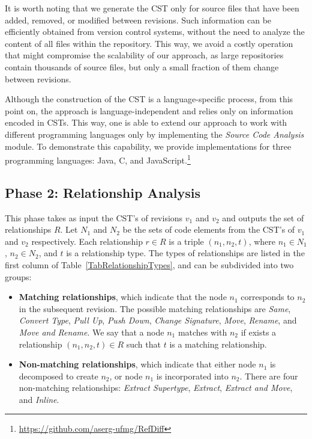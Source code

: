 It is worth noting that we generate the CST only for source files that have been added, removed, or modified between revisions. 
Such information can be efficiently obtained from version control systems, without the need to analyze the content of all files within the repository.
This way, we avoid a costly operation that might compromise the scalability of our approach, as large repositories contain thousands of source files, but only a small fraction of them change between revisions.

Although the construction of the CST is a language-specific process, from this point on, the approach is language-independent and relies only on information encoded in CSTs.
This way, one is able to extend our approach to work with different programming languages only by implementing the \emph{Source Code Analysis} module.
To demonstrate this capability, we provide implementations for three programming languages: Java, C, and JavaScript.\footnote{\url{https://github.com/aserg-ufmg/RefDiff}}


\subsection{Phase 2: Relationship Analysis}

This phase takes as input the CST's of revisions $v_1$ and $v_2$ and outputs the set of relationships $R$. Let $N_1$ and $N_2$ be the sets of code elements from the CST's of $v_1$ and $v_2$ respectively. Each relationship $r \in R$ is a triple $(n_1, n_2, t)$, where $n_1 \in N_1$, $n_2 \in N_2$, and $t$ is a relationship type. The types of relationships are listed in the first column of Table~\ref{TabRelationshipTypes}, and can be subdivided into two groups:
\begin{itemize}
\item \textbf{Matching relationships}, which indicate that the node $n_1$ corresponds to $n_2$ in the subsequent revision.
The possible matching relationships are \textit{Same}, \textit{Convert Type}, \textit{Pull Up}, \textit{Push Down}, \textit{Change Signature}, \textit{Move}, \textit{Rename}, and \textit{Move and Rename}.
We say that a node $n_1$ matches with $n_2$ if exists a relationship $(n_1, n_2, t) \in R$ such that $t$ is a matching relationship.

\item \textbf{Non-matching relationships}, which indicate that either node $n_1$ is decomposed to create $n_2$, or node $n_1$ is incorporated into $n_2$.
There are four non-matching relationships: \textit{Extract Supertype}, \textit{Extract}, \textit{Extract and Move}, and \textit{Inline}.
\end{itemize}


